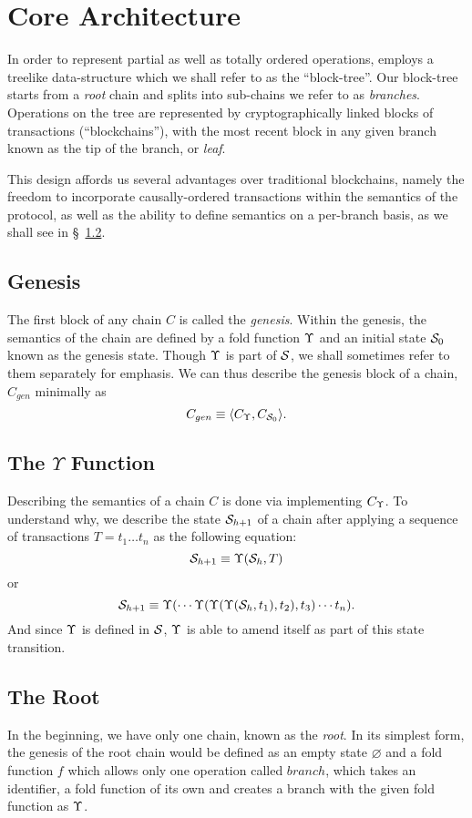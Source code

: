 \section{Core Architecture}

In order to represent partial as well as totally ordered operations, \oscoin{}
employs a treelike data-structure which we shall refer to as the ``block-tree''.
Our block-tree starts from a \emph{root} chain and splits into sub-chains
we refer to as \emph{branches}.  Operations on the tree are represented by
cryptographically linked blocks of transactions (``blockchains''), with the most
recent block in any given branch known as the tip of the branch, or \emph{leaf}.

This design affords us several advantages over traditional blockchains, namely
the freedom to incorporate causally-ordered transactions within the semantics
of the protocol, as well as the ability to define semantics on a per-branch
basis, as we shall see in \S~\ref{fold-function}.

\subsection{Genesis}

The first block of any chain $C$ is called the \emph{genesis}. Within the
genesis, the semantics of the chain are defined by a fold function $\Upsilon$ and
an initial state $\mathcal{S}_0$ known as the genesis state. Though $\Upsilon$ is part
of $\mathcal{S}$, we shall sometimes refer to them separately for emphasis.  We can
thus describe the genesis block of a chain, $C_{gen}$ minimally as
\[
    C_{gen} \equiv \langle C_{\Upsilon}, C_{\mathcal{S}_0} \rangle.
\]

\subsection{The $\Upsilon$ Function} \label{fold-function}

Describing the semantics of a chain $C$ is done via implementing $C_{\Upsilon}$.
To understand why, we describe the state $\mathcal{S}_{h+1}$ of a chain after
applying a sequence of transactions $T = t_1 \dots t_n$ as the following equation:
\[
    \mathcal{S}_{h+1} \equiv \Upsilon(\mathcal{S}_h, T)
\]
or
\[
    \mathcal{S}_{h+1} \equiv \Upsilon(\cdots \Upsilon(\Upsilon(\Upsilon(\mathcal{S}_h,
    t_1), t_2), t_3) \cdots t_n).
\]
And since $\Upsilon$ is defined in $\mathcal{S}$, $\Upsilon$ is able to amend itself as
part of this state transition.

\subsection{The Root}
In the beginning, we have only one chain, known as the \emph{root}. In its simplest
form, the genesis of the root chain would be defined as an empty state $\varnothing$
and a fold function $f$ which allows only one operation called $branch$, which takes
an identifier, a fold function of its own and creates a branch with the given
fold function as $\Upsilon$.
